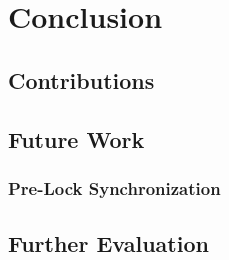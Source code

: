 \chapter{Conclusion}
\section{Contributions}
\section{Future Work}
\subsection{Pre-Lock Synchronization}
\section{Further Evaluation}